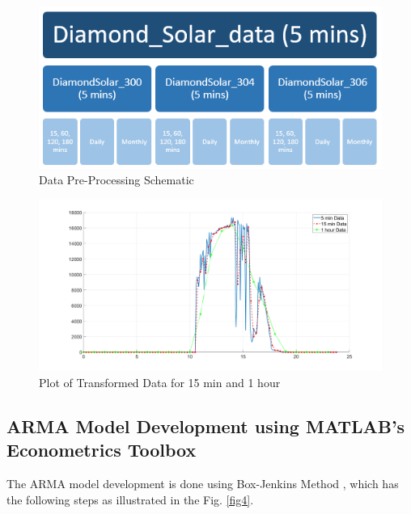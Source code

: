\documentclass[journal]{IEEEtran}
\begin{document}
\begin{figure}[htpb]
\centering
\includegraphics[scale=0.65]{DataTransformationSchematic.png}
\caption{Data Pre-Processing Schematic}
\label{fig2} %
\end{figure}

\begin{figure}[htpb]
	\centering
	\includegraphics[scale=0.2]{TransformedDataPlot.png}
	\caption{Plot of Transformed Data for 15 min and 1 hour}
	\label{fig3} %
\end{figure}



\subsection{ARMA Model Development using MATLAB’s Econometrics Toolbox}

The ARMA model development is done using Box-Jenkins Method \cite{box2015time}, which has the following steps as illustrated in the Fig. \ref{fig4}.
\end{document}
